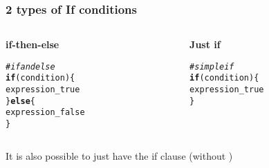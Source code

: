 \documentclass[12pt]{beamer}\usepackage[]{graphicx}\usepackage[]{color}
\makeatletter
\newcommand{\hlcom}[1]{\textcolor[rgb]{0.678,0.584,0.686}{\textit{#1}}}%
\newcommand{\hlstd}[1]{\textcolor[rgb]{0.345,0.345,0.345}{#1}}%
\newcommand{\hlkwa}[1]{\textcolor[rgb]{0.161,0.373,0.58}{\textbf{#1}}}%
\newenvironment{kframe}{%
 \def\at@end@of@kframe{}%
 \ifinner\ifhmode%
  \def\at@end@of@kframe{\end{minipage}}%
  \begin{minipage}{\columnwidth}%
 \fi\fi%
 \def\FrameCommand##1{\hskip\@totalleftmargin \hskip-\fboxsep
 \colorbox{shadecolor}{##1}\hskip-\fboxsep
     \hskip-\linewidth \hskip-\@totalleftmargin \hskip\columnwidth}%
 \MakeFramed {\advance\hsize-\width
   \@totalleftmargin\z@ \linewidth\hsize
   \@setminipage}}%
 {\par\unskip\endMakeFramed%
 \at@end@of@kframe}
\newenvironment{knitrout}{}{} %
\makeatother
\begin{document}

\begin{frame}[fragile]
\frametitle{2 types of If conditions}

\begin{columns}[t]
\begin{column}{0.45\textwidth}
\textbf{if-then-else}
\begin{knitrout}\footnotesize
{}\color{fgcolor}\begin{kframe}
\begin{alltt}
\hlcom{# if and else}
\hlkwa{if} \hlstd{(condition) \{}
  \hlstd{expression_true}
\hlstd{\}} \hlkwa{else} \hlstd{\{}
  \hlstd{expression_false}
\hlstd{\}}
\end{alltt}
\end{kframe}
\end{knitrout}
\end{column}

\begin{column}{0.45\textwidth}
\textbf{Just if}
\begin{knitrout}\footnotesize
{}\color{fgcolor}\begin{kframe}
\begin{alltt}
\hlcom{# simple if}
\hlkwa{if} \hlstd{(condition) \{}
  \hlstd{expression_true}
\hlstd{\}}
\end{alltt}
\end{kframe}
\end{knitrout}
\end{column}
\end{columns}

\bigskip
It is also possible to just have the if clause (without )

\end{frame}

\end{document}
